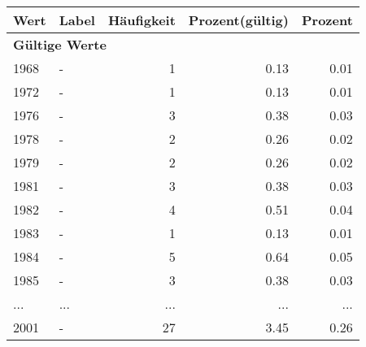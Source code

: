      \begin{longtable}{lXrrr}
     \toprule
     \textbf{Wert} & \textbf{Label} & \textbf{Häufigkeit} & \textbf{Prozent(gültig)} & \textbf{Prozent} \\
     \endhead
     \midrule
     \multicolumn{5}{l}{\textbf{Gültige Werte}}\\
        1968 & \multicolumn{1}{X}{-} & %
          \num{1} &
          \num[round-mode=places,round-precision=2]{0.13} &
          \num[round-mode=places,round-precision=2]{0.01} \\
        1972 & \multicolumn{1}{X}{-} & %
          \num{1} &
          \num[round-mode=places,round-precision=2]{0.13} &
          \num[round-mode=places,round-precision=2]{0.01} \\
        1976 & \multicolumn{1}{X}{-} & %
          \num{3} &
          \num[round-mode=places,round-precision=2]{0.38} &
          \num[round-mode=places,round-precision=2]{0.03} \\
        1978 & \multicolumn{1}{X}{-} & %
          \num{2} &
          \num[round-mode=places,round-precision=2]{0.26} &
          \num[round-mode=places,round-precision=2]{0.02} \\
        1979 & \multicolumn{1}{X}{-} & %
          \num{2} &
          \num[round-mode=places,round-precision=2]{0.26} &
          \num[round-mode=places,round-precision=2]{0.02} \\
        1981 & \multicolumn{1}{X}{-} & %
          \num{3} &
          \num[round-mode=places,round-precision=2]{0.38} &
          \num[round-mode=places,round-precision=2]{0.03} \\
        1982 & \multicolumn{1}{X}{-} & %
          \num{4} &
          \num[round-mode=places,round-precision=2]{0.51} &
          \num[round-mode=places,round-precision=2]{0.04} \\
        1983 & \multicolumn{1}{X}{-} & %
          \num{1} &
          \num[round-mode=places,round-precision=2]{0.13} &
          \num[round-mode=places,round-precision=2]{0.01} \\
        1984 & \multicolumn{1}{X}{-} & %
          \num{5} &
          \num[round-mode=places,round-precision=2]{0.64} &
          \num[round-mode=places,round-precision=2]{0.05} \\
        1985 & \multicolumn{1}{X}{-} & %
          \num{3} &
          \num[round-mode=places,round-precision=2]{0.38} &
          \num[round-mode=places,round-precision=2]{0.03} \\
       ... & ... & ... & ... & ... \\
        2001 & \multicolumn{1}{X}{-} & %
          \num{27} &
          \num[round-mode=places,round-precision=2]{3.45} &
          \num[round-mode=places,round-precision=2]{0.26} \\


\end{longtable}
